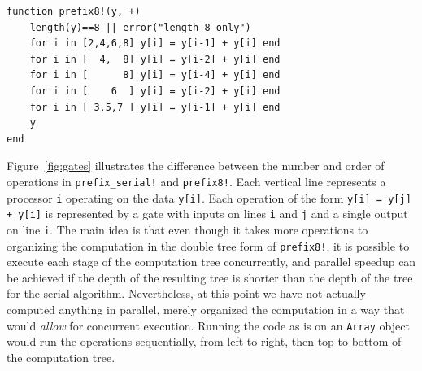 \documentclass{sig-alternate}
\newcommand{\code}[1]{\texttt{#1}}
\begin{document}
\begin{verbatim}
function prefix8!(y, +)
    length(y)==8 || error("length 8 only")
    for i in [2,4,6,8] y[i] = y[i-1] + y[i] end
    for i in [  4,  8] y[i] = y[i-2] + y[i] end
    for i in [      8] y[i] = y[i-4] + y[i] end
    for i in [    6  ] y[i] = y[i-2] + y[i] end
    for i in [ 3,5,7 ] y[i] = y[i-1] + y[i] end
    y
end
\end{verbatim}

Figure~\ref{fig:gates} illustrates the difference between the number and order
of operations in \code{prefix\allowbreak\_serial!} and \code{prefix8!}. Each vertical line
represents a processor \code{i} operating on the data \code{y[i]}. Each
operation of the form \code{y[i] = y[j] + y[i]} is represented by a gate with
inputs on lines \code{i} and \code{j} and a single output on line \code{i}. The
main idea is that even though it takes more operations to organizing the
computation in the double tree form of \code{prefix8!}, it is possible to
execute each stage of the computation tree concurrently, and parallel speedup
can be achieved if the depth of the resulting tree is shorter than the depth of
the tree for the serial algorithm. Nevertheless, at this point we have not
actually computed anything in parallel, merely organized the computation in a
way that would \textit{allow} for concurrent execution. Running the code as is
on an \code{Array} object would run the operations sequentially, from left to
right, then top to bottom of the computation tree. 
\end{document}
